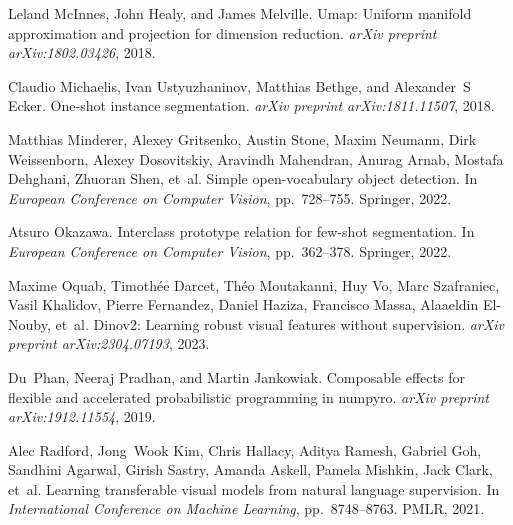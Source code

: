 \begin{thebibliography}{52}
Leland McInnes, John Healy, and James Melville.
\newblock Umap: Uniform manifold approximation and projection for dimension
  reduction.
\newblock \emph{arXiv preprint arXiv:1802.03426}, 2018.

Claudio Michaelis, Ivan Ustyuzhaninov, Matthias Bethge, and Alexander~S Ecker.
\newblock One-shot instance segmentation.
\newblock \emph{arXiv preprint arXiv:1811.11507}, 2018.

Matthias Minderer, Alexey Gritsenko, Austin Stone, Maxim Neumann, Dirk
  Weissenborn, Alexey Dosovitskiy, Aravindh Mahendran, Anurag Arnab, Mostafa
  Dehghani, Zhuoran Shen, et~al.
\newblock Simple open-vocabulary object detection.
\newblock In \emph{European Conference on Computer Vision}, pp.\  728--755.
  Springer, 2022.

Atsuro Okazawa.
\newblock Interclass prototype relation for few-shot segmentation.
\newblock In \emph{European Conference on Computer Vision}, pp.\  362--378.
  Springer, 2022.

Maxime Oquab, Timoth{\'e}e Darcet, Th{\'e}o Moutakanni, Huy Vo, Marc
  Szafraniec, Vasil Khalidov, Pierre Fernandez, Daniel Haziza, Francisco Massa,
  Alaaeldin El-Nouby, et~al.
\newblock Dinov2: Learning robust visual features without supervision.
\newblock \emph{arXiv preprint arXiv:2304.07193}, 2023.

Du~Phan, Neeraj Pradhan, and Martin Jankowiak.
\newblock Composable effects for flexible and accelerated probabilistic
  programming in numpyro.
\newblock \emph{arXiv preprint arXiv:1912.11554}, 2019.

Alec Radford, Jong~Wook Kim, Chris Hallacy, Aditya Ramesh, Gabriel Goh,
  Sandhini Agarwal, Girish Sastry, Amanda Askell, Pamela Mishkin, Jack Clark,
  et~al.
\newblock Learning transferable visual models from natural language
  supervision.
\newblock In \emph{International Conference on Machine Learning}, pp.\
  8748--8763. PMLR, 2021.


\end{thebibliography}
